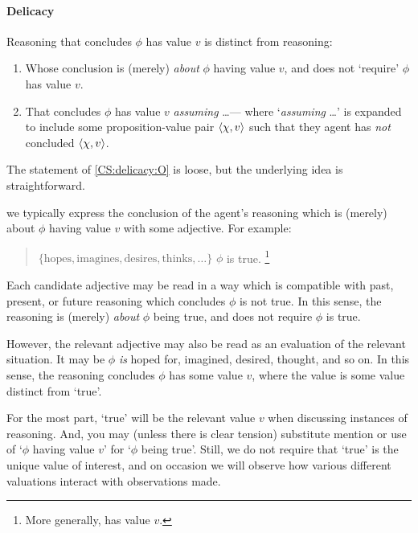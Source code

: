 \paragraph*{Delicacy}

\begin{note}
  Reasoning that concludes \(\phi\) has value \(v\) is distinct from reasoning:
  \begin{enumerate}[label=\Alph*., ref=(\Alph*)]
  \item
    \label{CS:delicacy:O}
    Whose conclusion is (merely) \emph{about} \(\phi\) having value \(v\), and does not `require' \(\phi\) has value \(v\).
  \item
    \label{CS:delicacy:A}
    That concludes \(\phi\) has value \(v\) \emph{assuming} \dots\space --- where `\emph{assuming} \dots\space' is expanded to include some proposition-value pair \(\langle \chi, v \rangle\) such that they agent has \emph{not} concluded \(\langle \chi, v \rangle\).
  \end{enumerate}
\end{note}

\begin{note}
  The statement of \ref{CS:delicacy:O} is loose, but the underlying idea is straightforward.

  we typically express the conclusion of the agent's reasoning which is (merely) about \(\phi\) having value \(v\) with some adjective.
  For example:

  \begin{quote}
    \vAgent{} \(\{ \text{hopes}, \text{imagines}, \text{desires}, \text{thinks}, \dots \}\) \(\phi\) is true.%
    \footnote{
      More generally, has value \(v\).
    }
  \end{quote}
  Each candidate adjective may be read in a way which is compatible with past, present, or future reasoning which concludes \(\phi\) is not true.
  In this sense, the reasoning is (merely) \emph{about} \(\phi\) being true, and does not require \(\phi\) is true.

  However, the relevant adjective may also be read as an evaluation of the relevant situation.
  It may be \(\phi\) \emph{is} hoped for, imagined, desired, thought, and so on.
  In this sense, the reasoning concludes \(\phi\) has some value \(v\), where the value is some value distinct from `true'.

  For the most part, `true' will be the relevant value \(v\) when discussing instances of reasoning.
  And, you may (unless there is clear tension) substitute mention or use of `\(\phi\) having value \(v\)' for `\(\phi\) being true'.
  Still, we do not require that `true' is the unique value of interest, and on occasion we will observe how various different valuations interact with observations made.
\end{note}

